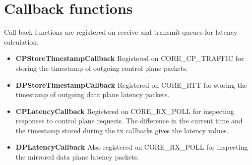 \section{Callback functions}
Call back functions are registered on receive and transmit queues for latency calculation.
\begin{itemize}
	\item \textbf{CPStoreTimestampCallback}
	      Registered on CORE\_CP\_TRAFFIC for storing the timestamp of outgoing control plane packets.
	\item \textbf{DPStoreTimestampCallback}
	      Registered on CORE\_RTT for storing the timestamp of outgoing  data plane latency packets.

	\item \textbf{CPLatencyCallback}
	      Registered on CORE\_RX\_POLL for inspecting responses to control plane
	      requests. The difference in the current time and the  timestamp stored during the
	      tx callbacks gives the latency values.
	\item \textbf{DPLatencyCallback}
	      Also registered on CORE\_RX\_POLL for inspecting the mirrored data plane
	      latency packets.
\end{itemize}
%
